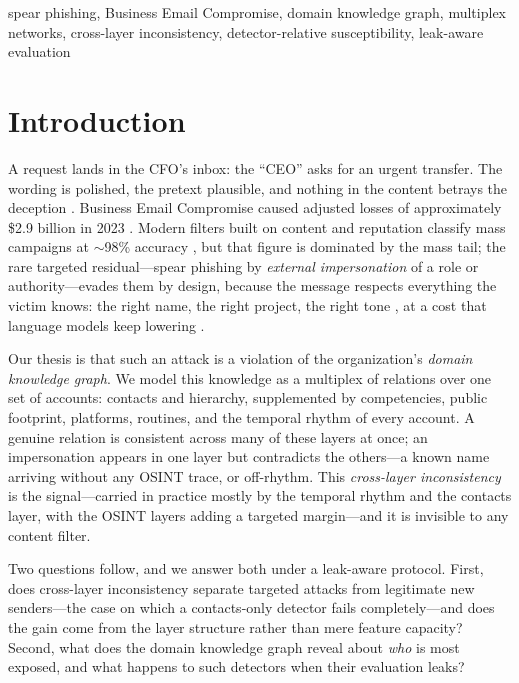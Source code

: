 \documentclass[conference]{IEEEtran}
\begin{document}
\begin{IEEEkeywords}
spear phishing, Business Email Compromise, domain knowledge graph, multiplex networks, cross-layer
inconsistency, detector-relative susceptibility, leak-aware evaluation
\end{IEEEkeywords}

\section{Introduction}
\label{sec:intro}
A request lands in the CFO's inbox: the ``CEO'' asks for an urgent transfer. The wording is polished, the
pretext plausible, and nothing in the content betrays the deception \cite{butavicius2022why,sturman2025security}.
Business Email Compromise caused adjusted losses of approximately \$2.9 billion in 2023 \cite{fbi2024ic3}.
Modern filters built on content and reputation classify mass campaigns at $\sim$98\% accuracy
\cite{birthriya2025detection,tan2020graph}, but that figure is dominated by the mass tail; the rare targeted
residual---spear phishing by \emph{external impersonation} of a role or authority---evades them by design, because the message respects everything the
victim knows: the right name, the right project, the right tone \cite{dewan2014analyzing,brown2025web}, at a cost
that language models keep lowering \cite{bethany2024evaluating}.

Our thesis is that such an attack is a violation of the organization's \emph{domain knowledge graph}. We model
this knowledge as a multiplex of relations over one set of accounts: contacts and hierarchy, supplemented by
competencies, public footprint, platforms, routines, and the temporal rhythm of every account. A genuine
relation is consistent across many of these layers at once; an impersonation appears in one layer but
contradicts the others---a known name arriving without any OSINT trace, or off-rhythm. This
\emph{cross-layer inconsistency} is the signal---carried in practice mostly by the temporal rhythm and the
contacts layer, with the OSINT layers adding a targeted margin---and it is invisible to any content filter.

Two questions follow, and we answer both under a leak-aware protocol. First, does cross-layer inconsistency
separate targeted attacks from legitimate new senders---the case on which a contacts-only detector fails
completely---and does the gain come from the layer structure rather than mere feature capacity? Second, what does the domain knowledge
graph reveal about \emph{who} is most exposed, and what happens to such detectors when their evaluation leaks?
\end{document}
